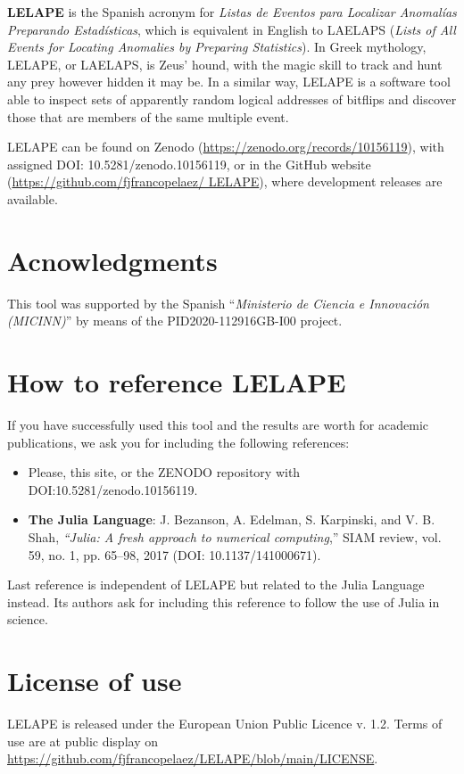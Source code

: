 \textbf{LELAPE} is the Spanish acronym for \textit{Listas de Eventos para Localizar Anomalías Preparando Estadísticas}, which is equivalent in English to LAELAPS (\textit{Lists of All Events for Locating Anomalies by Preparing Statistics}). In Greek mythology, LELAPE, or LAELAPS, is Zeus' hound, with the magic skill to track and hunt any prey however hidden it may be. In a similar way, LELAPE is a software tool able to inspect sets of apparently random logical addresses of bitflips and discover those that are members of the same multiple event.

LELAPE can be found on Zenodo (\href{https://zenodo.org/records/10156119}{https://zenodo.org/records/10156119}), with assigned DOI:  10.5281/zenodo.10156119, or in the GitHub website (\href{https://github.com/fjfrancopelaez/LELAPE}{https://github.com/fjfrancopelaez/ LELAPE}), where development releases are available.

\section{Acnowledgments}
%
This tool was supported by the Spanish ``\textit{Ministerio de Ciencia e Innovación (MICINN)}'' by means of the PID2020-112916GB-I00 project.
\section{How to reference LELAPE}
%
If you have successfully used this tool and the results are worth for academic publications, we ask you for including the following references:
%
\begin{itemize}
	\item Please, this site, or the ZENODO repository with DOI:10.5281/zenodo.10156119.
	\item \textbf{The Julia Language}: J. Bezanson, A. Edelman, S. Karpinski, and V. B. Shah, \textit{“Julia: A fresh approach to numerical computing},” SIAM review, vol. 59, no. 1, pp. 65–98, 2017 (DOI: 10.1137/141000671).
\end{itemize}
%
Last reference is independent of LELAPE but related to the Julia Language instead. Its authors ask for including this reference to follow the use of Julia in science.
%
\section{License of use}
%
LELAPE is released under the European Union Public Licence v. 1.2. Terms of use are at public display on \href{https://github.com/fjfrancopelaez/LELAPE/blob/main/LICENSE}{https://github.com/fjfrancopelaez/LELAPE/blob/main/LICENSE}. 


